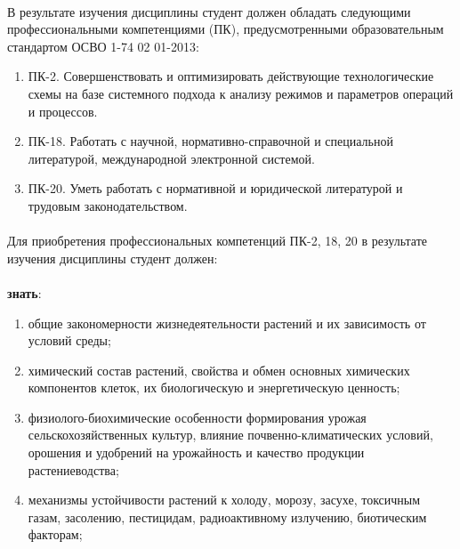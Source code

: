 \paragraph*{}В результате изучения дисциплины студент должен обладать следующими профессиональными компетенциями (ПК), предусмотренными образовательным стандартом ОСВО 1-74 02 01-2013:

\begin{enumerate}

\item ПК-2. Совершенствовать и оптимизировать действующие технологические схемы на базе системного подхода к анализу режимов и параметров операций и процессов.
\item ПК-18. Работать с научной, нормативно-справочной и специальной литературой, международной электронной системой.
\item ПК-20. Уметь работать с нормативной и юридической литературой и трудовым законодательством.

\end{enumerate}

\paragraph*{}Для приобретения профессиональных компетенций ПК-2, 18, 20 в результате изучения дисциплины студент должен:

\paragraph*{}\textbf{знать}: 

\begin{enumerate}

\item общие закономерности жизнедеятельности растений и их зависимость от условий среды;
\item химический состав растений, свойства и обмен основных химических компонентов клеток, их биологическую и энергетическую ценность;
\item физиолого-биохимические особенности формирования урожая сельскохозяйственных культур, влияние почвенно-климатических условий, орошения и удобрений на урожайность и качество продукции растениеводства;
\item механизмы устойчивости растений к холоду, морозу, засухе, токсичным газам, засолению, пестицидам, радиоактивному излучению, биотическим факторам;

\end{enumerate}

